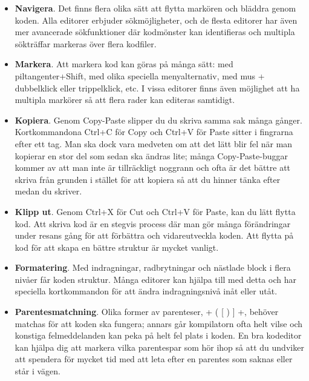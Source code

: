 \begin{itemize}
\item \textbf{Navigera}. Det finns flera olika sätt att flytta markören och bläddra genom koden. Alla editorer erbjuder sökmöjligheter, och de flesta editorer har även mer avancerade sökfunktioner där kodmönster kan identifieras och multipla sökträffar markeras över flera kodfiler. 

\item \textbf{Markera}. Att markera kod kan göras på många sätt: med piltangenter+Shift, med olika speciella menyalternativ, med mus + dubbelklick eller trippelklick, etc. I vissa editorer finns även möjlighet att ha multipla markörer så att flera rader kan editeras samtidigt.

\item \textbf{Kopiera}. Genom Copy-Paste slipper du du skriva samma sak många gånger. Kortkommandona Ctrl+C för Copy och Ctrl+V för Paste sitter i fingrarna efter ett tag. Man ska dock vara medveten om att det lätt blir fel när man kopierar en stor del som sedan ska ändras lite; många Copy-Paste-buggar kommer av att man inte är tillräckligt noggrann och ofta är det bättre att skriva från grunden i stället för att kopiera så att du hinner tänka efter medan du skriver.

\item \textbf{Klipp ut}. Genom Ctrl+X för Cut och Ctrl+V för Paste, kan du lätt flytta kod. Att skriva kod är en stegvis process där man gör många förändringar under resans gång för att förbättra och vidareutveckla koden. Att flytta på kod för att skapa en bättre struktur är mycket vanligt.

\item \textbf{Formatering}. Med indragningar, radbrytningar och nästlade block i flera nivåer får koden struktur. Många editorer kan hjälpa till med detta och har speciella kortkommandon för att ändra indragningsnivå inåt eller utåt. 

\item \textbf{Parentesmatchning}. Olika former av parenteser, \code+ ( { [ ) } ] +,  behöver matchas för att koden ska fungera; annars går kompilatorn ofta helt vilse och konstiga felmeddelanden kan peka på helt fel plats i koden. En bra kodeditor kan hjälpa dig att markera vilka parentespar som hör ihop så att du undviker att spendera för mycket tid med att leta efter en parentes som saknas eller står i vägen.
    
\end{itemize}

